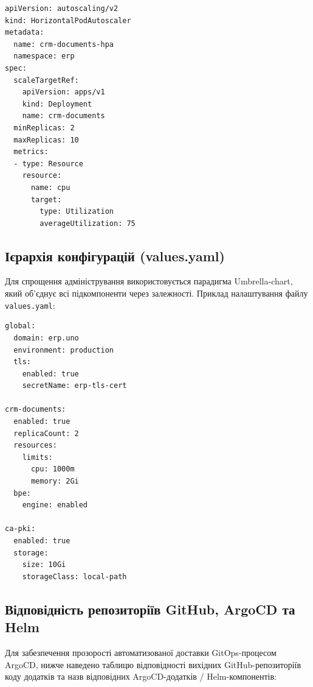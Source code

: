 \documentclass{article}
\begin{document}
\begin{lstlisting}
apiVersion: autoscaling/v2
kind: HorizontalPodAutoscaler
metadata:
  name: crm-documents-hpa
  namespace: erp
spec:
  scaleTargetRef:
    apiVersion: apps/v1
    kind: Deployment
    name: crm-documents
  minReplicas: 2
  maxReplicas: 10
  metrics:
  - type: Resource
    resource:
      name: cpu
      target:
        type: Utilization
        averageUtilization: 75
\end{lstlisting}

\subsection{Ієрархія конфігурацій (values.yaml)}
Для спрощення адміністрування використовується парадигма Umbrella-chart, який об'єднує всі підкомпоненти через залежності. Приклад налаштування файлу \texttt{values.yaml}:
\begin{lstlisting}
global:
  domain: erp.uno
  environment: production
  tls:
    enabled: true
    secretName: erp-tls-cert

crm-documents:
  enabled: true
  replicaCount: 2
  resources:
    limits:
      cpu: 1000m
      memory: 2Gi
  bpe:
    engine: enabled

ca-pki:
  enabled: true
  storage:
    size: 10Gi
    storageClass: local-path
\end{lstlisting}

\subsection{Відповідність репозиторіїв GitHub, ArgoCD та Helm}
 
Для забезпечення прозорості автоматизованої доставки GitOps-процесом ArgoCD, нижче наведено таблицю відповідності вихідних GitHub-репозиторіїв коду додатків та назв відповідних ArgoCD-додатків / Helm-компонентів:
\end{document}
